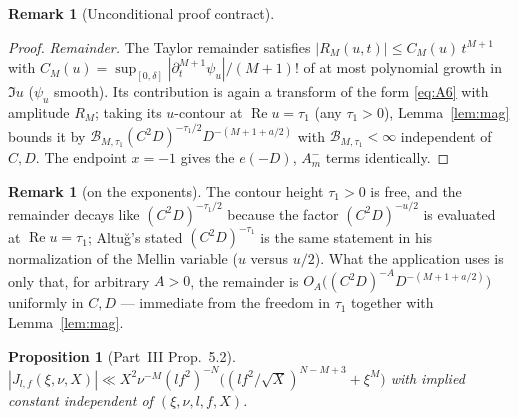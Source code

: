 \documentclass[11pt]{article}
\newtheorem{proposition}[theorem]{Proposition}
\theoremstyle{definition}
\newtheorem{remark}[theorem]{Remark}
\renewcommand{\Re}{\operatorname{Re}}
\begin{document}
\begin{remark}[Unconditional proof contract]
\begin{enumerate}
\begin{proof}
\emph{Remainder.} The Taylor remainder satisfies $|R_M(u,t)|\le C_M(u)\,t^{M+1}$ with
$C_M(u)=\sup_{[0,\delta]}|\partial_t^{M+1}\psi_u|/(M+1)!$ of at most polynomial growth in $\Im u$
($\psi_u$ smooth). Its contribution is again a transform of the form \eqref{eq:A6} with amplitude
$R_M$; taking its $u$-contour at $\Re u=\tau_1$ (any $\tau_1>0$), Lemma~\ref{lem:mag} bounds it by
$\mathcal B_{M,\tau_1}(C^2D)^{-\tau_1/2}D^{-(M+1+a/2)}$ with $\mathcal B_{M,\tau_1}<\infty$
independent of $C,D$. The endpoint $x=-1$ gives the $e(-D)$, $A^-_m$ terms identically.
\end{proof}

\begin{remark}[on the exponents]
The contour height $\tau_1>0$ is free, and the remainder decays like $(C^2D)^{-\tau_1/2}$ because the
factor $(C^2D)^{-u/2}$ is evaluated at $\Re u=\tau_1$; Altu\u{g}'s stated $(C^2D)^{-\tau_1}$ is the same
statement in his normalization of the Mellin variable ($u$ versus $u/2$). What the application uses is
only that, for arbitrary $A>0$, the remainder is $O_A\big((C^2D)^{-A}D^{-(M+1+a/2)}\big)$ uniformly in
$C,D$ --- immediate from the freedom in $\tau_1$ together with Lemma~\ref{lem:mag}.
\end{remark}

\begin{proposition}[Part~III Prop.~5.2]\label{prop:52}
$|J_{l,f}(\xi,\nu,X)|\ll X^2\nu^{-M}(lf^2)^{-N}\big((lf^2/\sqrt X)^{N-M+3}+\xi^M\big)$ with implied
constant independent of $(\xi,\nu,l,f,X)$.
\end{proposition}


\end{enumerate}
\end{remark}
\end{document}
